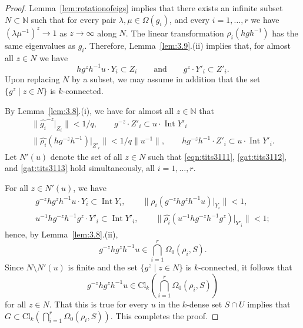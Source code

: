 \documentclass{amsart}
\theoremstyle{plain}
\theoremstyle{definition}
\theoremstyle{remark}
\DeclareMathOperator{\Int}{Int}
\providecommand{\norm}[1]{\lVert#1\rVert}
\begin{document}
\begin{proof}
Lemma~\ref{lem:rotationofeigs} implies that there exists an infinite subset $N \subset \mathbb{N}$ such
that for every pair $\lambda, \mu \in \Omega(g_{i})$, and every $i = 1,\ldots, r$ we
have $(\lambda\mu^{-1})^{z} \to 1$ as $z \to \infty$ along $N$.
The linear transformation $\rho_{i}(hgh^{-1})$ has the same eigenvalues as $g_{i}$.
Therefore, Lemma~\ref{lem:3.9}.(ii) implies that, for almost all $z \in N$
we have
\begin{equation}\label{eqn:tits3111}
hg^{z}h^{-1}u\cdot Y_{i} \subset Z_{i} \qquad \text{and}\qquad g^{z}\cdot Y'_{i} \subset
Z'_{i}.
\end{equation}
Upon replacing $N$ by a subset, we may assume in addition that the set $\{g^{z} \mid z \in N\}$
is $k$-connected.

By Lemma~\ref{lem:3.8}.(i), we have for almost all $z \in \mathbb{N}$ that
\begin{gather}
\norm{\widehat{g_{i}}^{-z}|_{Z_{i}}} < 1/q,\qquad g^{-z}\cdot Z'_{i} \subset u\cdot
\Int Y'_{i}\label{gat:tits3112}\\
\norm{\widehat{\rho_{i}}(hg^{-z}h^{-1})|_{Z'_{i}}} < 1/q\norm{u^{-1}},
\qquad hg^{-z}h^{-1}\cdot Z'_{i} \subset u\cdot \Int Y'_{i}.\label{gat:tits3113}
\end{gather}
Let $N'(u)$ denote the set of all $z \in N$ such that \eqref{eqn:tits3111},
\eqref{gat:tits3112}, and \eqref{gat:tits3113} hold simultaneously, all $i = 1,\ldots,
r$.

For all $z \in N'(u)$, we have
\begin{gather*}
g^{-z}hg^{z}h^{-1}u \cdot Y_{i} \subset \Int Y_{i}, \qquad
\norm{\widehat{\rho_{i}}(g^{-z}hg^{z}h^{-1}u)|_{Y_{i}}} < 1,\\
u^{-1}hg^{-z}h^{-1}g^{z} \cdot Y'_{i} \subset \Int Y'_{i}, \qquad
\norm{\widehat{\rho_{i}}(u^{-1}hg^{-z}h^{-1}g^{z})|_{Y'_{i}}} < 1;
\end{gather*}
hence, by Lemma~\ref{lem:3.8}.(ii),
$$g^{-z}hg^{z}h^{-1}u \in \bigcap_{i = 1}^{r} \Omega_{0}(\rho_{i}, S).$$
Since $N\setminus N'(u)$ is finite and the set $\{g^{z} \mid z \in N\}$
is $k$-connected, it follows that $$g^{-z}hg^{z}h^{-1}u \in
\mathrm{Cl}_{k}\left(\bigcap_{i = 1}^{r} \Omega_{0}(\rho_{i}, S)\right)$$
for all $z \in N$. That this is true for every $u$
in the $k$-dense set $S \cap U$ implies that $G \subset \mathrm{Cl}_{k}(\bigcap_{i =
1}^{r} \Omega_{0}(\rho_{i}, S))$. This completes the proof.
\end{proof}
\end{document}
